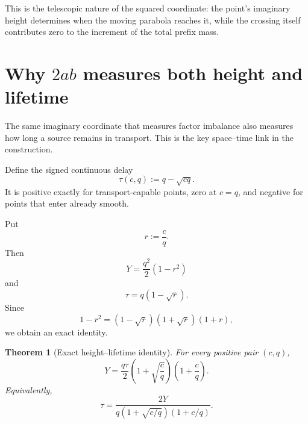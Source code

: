 \documentclass[11pt]{article}
\newtheorem{theorem}{Theorem}[section]
\theoremstyle{definition}
\newcommand{\1}{\mathbf{1}}
\begin{document}
This is the telescopic nature of the squared coordinate: the point's imaginary height determines when the moving parabola reaches it, while the crossing itself contributes zero to the increment of the total prefix mass.


\section{Why $2ab$ measures both height and lifetime}
\label{sec:lifetime-law}

The same imaginary coordinate that measures factor imbalance also measures how long a source remains in transport.  This is the key space--time link in the construction.

Define the signed continuous delay
\begin{equation}
 \tau(c,q):=q-\sqrt{cq}.
 \label{eq:tau}
\end{equation}
It is positive exactly for transport-capable points, zero at $c=q$, and negative for points that enter already smooth.

Put
\begin{equation}
 r:=\frac cq.
 \label{eq:r-ratio}
\end{equation}
Then
\begin{equation}
 Y=\frac{q^2}{2}(1-r^2)
 \label{eq:Y-r}
\end{equation}
and
\begin{equation}
 \tau=q(1-\sqrt r).
 \label{eq:tau-r}
\end{equation}
Since
\begin{equation}
 1-r^2=(1-\sqrt r)(1+\sqrt r)(1+r),
 \label{eq:factor-r}
\end{equation}
we obtain an exact identity.

\begin{theorem}[Exact height--lifetime identity]
\label{thm:exact-height-lifetime}
For every positive pair $(c,q)$,
\begin{equation}
 \boxed{
 Y
 =
 \frac{q\tau}{2}
 \left(1+\sqrt{\frac cq}\right)
 \left(1+\frac cq\right).
 }
 \label{eq:Y-tau-exact}
\end{equation}
Equivalently,
\begin{equation}
 \boxed{
 \tau
 =
 \frac{2Y}
 {q\left(1+\sqrt{c/q}\right)\left(1+c/q\right)}.
 }
 \label{eq:tau-Y-exact}
\end{equation}
\end{theorem}
\end{document}
